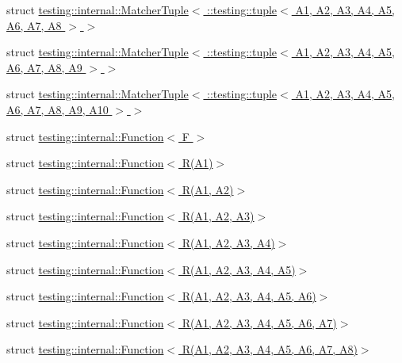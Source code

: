 \begin{DoxyCompactItemize}
\item 
struct \hyperlink{structtesting_1_1internal_1_1_matcher_tuple_3_01_1_1testing_1_1tuple_3_01_a1_00_01_a2_00_01_a3_0d8930d50f28e62c202d0bf6b34d01eac}{testing\+::internal\+::\+Matcher\+Tuple$<$ \+::testing\+::tuple$<$ A1, A2, A3, A4, A5, A6, A7, A8 $>$ $>$}
\item 
struct \hyperlink{structtesting_1_1internal_1_1_matcher_tuple_3_01_1_1testing_1_1tuple_3_01_a1_00_01_a2_00_01_a3_05ce0d9708ffc0cc1f9fec180f9f8202e}{testing\+::internal\+::\+Matcher\+Tuple$<$ \+::testing\+::tuple$<$ A1, A2, A3, A4, A5, A6, A7, A8, A9 $>$ $>$}
\item 
struct \hyperlink{structtesting_1_1internal_1_1_matcher_tuple_3_01_1_1testing_1_1tuple_3_01_a1_00_01_a2_00_01_a3_0842d32b3c1d00aa4e42fe38fbc4fa689}{testing\+::internal\+::\+Matcher\+Tuple$<$ \+::testing\+::tuple$<$ A1, A2, A3, A4, A5, A6, A7, A8, A9, A10 $>$ $>$}
\item 
struct \hyperlink{structtesting_1_1internal_1_1_function}{testing\+::internal\+::\+Function$<$ F $>$}
\item 
struct \hyperlink{structtesting_1_1internal_1_1_function_3_01_r_07_a1_08_4}{testing\+::internal\+::\+Function$<$ R(\+A1)$>$}
\item 
struct \hyperlink{structtesting_1_1internal_1_1_function_3_01_r_07_a1_00_01_a2_08_4}{testing\+::internal\+::\+Function$<$ R(\+A1, A2)$>$}
\item 
struct \hyperlink{structtesting_1_1internal_1_1_function_3_01_r_07_a1_00_01_a2_00_01_a3_08_4}{testing\+::internal\+::\+Function$<$ R(\+A1, A2, A3)$>$}
\item 
struct \hyperlink{structtesting_1_1internal_1_1_function_3_01_r_07_a1_00_01_a2_00_01_a3_00_01_a4_08_4}{testing\+::internal\+::\+Function$<$ R(\+A1, A2, A3, A4)$>$}
\item 
struct \hyperlink{structtesting_1_1internal_1_1_function_3_01_r_07_a1_00_01_a2_00_01_a3_00_01_a4_00_01_a5_08_4}{testing\+::internal\+::\+Function$<$ R(\+A1, A2, A3, A4, A5)$>$}
\item 
struct \hyperlink{structtesting_1_1internal_1_1_function_3_01_r_07_a1_00_01_a2_00_01_a3_00_01_a4_00_01_a5_00_01_a6_08_4}{testing\+::internal\+::\+Function$<$ R(\+A1, A2, A3, A4, A5, A6)$>$}
\item 
struct \hyperlink{structtesting_1_1internal_1_1_function_3_01_r_07_a1_00_01_a2_00_01_a3_00_01_a4_00_01_a5_00_01_a6_00_01_a7_08_4}{testing\+::internal\+::\+Function$<$ R(\+A1, A2, A3, A4, A5, A6, A7)$>$}
\item 
struct \hyperlink{structtesting_1_1internal_1_1_function_3_01_r_07_a1_00_01_a2_00_01_a3_00_01_a4_00_01_a5_00_01_a6_00_01_a7_00_01_a8_08_4}{testing\+::internal\+::\+Function$<$ R(\+A1, A2, A3, A4, A5, A6, A7, A8)$>$}

\end{DoxyCompactItemize}
